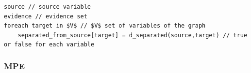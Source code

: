 \begin{lstlisting}
source // source variable
evidence // evidence set
foreach target in $V$ // $V$ set of variables of the graph
	separated_from_source[target] = d_separated(source,target) // true or false for each variable
\end{lstlisting}


\subsubsection{MPE}
